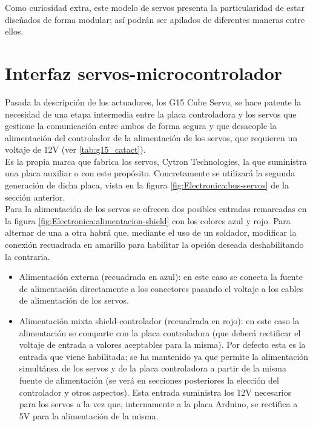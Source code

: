     Como curiosidad extra, este modelo de servos presenta la particularidad de estar diseñados de forma modular; así podrán ser apilados de diferentes maneras entre ellos.

\section{Interfaz servos-microcontrolador} \label{sec:Electronica:Potencia}

	Pasada la descripción de los actuadores, los G15 Cube Servo, se hace patente la necesidad de una etapa intermedia entre la placa controladora y los servos que gestione la comunicación entre ambos de forma segura y que desacople la alimentación del controlador de la alimentación de los servos, que requieren un voltaje de 12V (ver \ref{tab:g15_catact}).
	\\

	Es la propia marca que fabrica los servos, Cytron Technologies, la que suministra una placa auxiliar o  con este propósito. Concretamente se utilizará la segunda generación de dicha placa, vista en la figura \ref{fig:Electronica:bus-servos} de la sección anterior.
	\\

	Para la alimentación de los servos se ofrecen dos posibles entradas remarcadas en la figura \ref{fig:Electronica:alimentacion-shield} con los colores azul y rojo. Para alternar de una a otra habrá que, mediante el uso de un soldador, modificar la conexión recuadrada en amarillo para habilitar la opción deseada deshabilitando la contraria.
	\begin{itemize}
		\item Alimentación externa (recuadrada en azul): en este caso se conecta la fuente de alimentación directamente a los conectores pasando el voltaje a los cables de alimentación de los servos.
		\item Alimentación mixta shield-controlador (recuadrada en rojo): en este caso la alimentación se comparte con la placa controladora (que deberá rectificar el voltaje de entrada a valores aceptables para la misma). Por defecto esta es la entrada que viene habilitada; se ha mantenido ya que permite la alimentación simultánea de los servos y de la placa controladora a partir de la misma fuente de alimentación (se verá en secciones posteriores la elección del controlador y otros aspectos). Esta entrada suministra los 12V necesarios para los servos a la vez que, internamente a la placa Arduino, se rectifica a 5V para la alimentación de la misma.
	\end{itemize}

